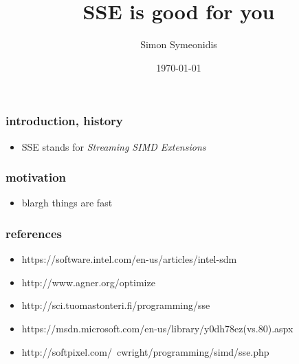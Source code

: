 \documentclass{beamer}
\title{SSE is good for you}
\author{Simon Symeonidis}
\date{\today}
\begin{document}
\begin{frame}
  \titlepage
\end{frame}

\begin{frame}
  \frametitle{introduction, history}
  \begin{itemize}
  \item SSE stands for \textit{Streaming SIMD Extensions}
  \end{itemize}
\end{frame}

\begin{frame}
  \frametitle{motivation}
  \begin{itemize}
    \item blargh things are fast
  \end{itemize}
\end{frame}

\begin{frame}
  \frametitle{references}
  \begin{itemize}
   \item https://software.intel.com/en-us/articles/intel-sdm
   \item http://www.agner.org/optimize
   \item http://sci.tuomastonteri.fi/programming/sse
   \item https://msdn.microsoft.com/en-us/library/y0dh78ez(vs.80).aspx
   \item http://softpixel.com/~cwright/programming/simd/sse.php
  \end{itemize}
\end{frame}
\end{document}
